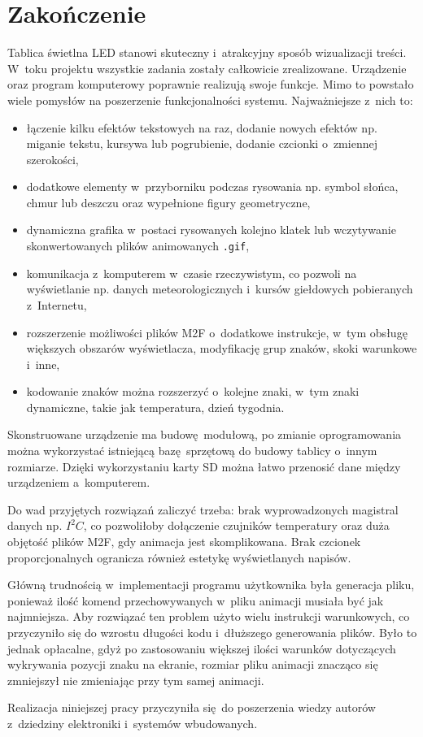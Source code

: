 \chapter{Zakończenie}

Tablica świetlna LED stanowi skuteczny i~atrakcyjny sposób wizualizacji treści. W~toku projektu wszystkie zadania zostały całkowicie zrealizowane. Urządzenie oraz program komputerowy poprawnie realizują swoje funkcje. Mimo to powstało wiele pomysłów na poszerzenie funkcjonalności systemu. Najważniejsze z~nich to:

\begin{itemize}
	\item łączenie kilku efektów tekstowych na raz, dodanie nowych efektów np. miganie tekstu, kursywa lub pogrubienie, dodanie czcionki o~zmiennej szerokości,
	\item dodatkowe elementy w~przyborniku podczas rysowania np. symbol słońca, chmur lub deszczu oraz wypełnione figury geometryczne,
	\item dynamiczna grafika w~postaci rysowanych kolejno klatek lub wczytywanie skonwertowanych plików animowanych \texttt{.gif},
	\item komunikacja z~komputerem w~czasie rzeczywistym, co pozwoli na wyświetlanie np. danych meteorologicznych i~kursów giełdowych pobieranych z~Internetu,
	\item rozszerzenie możliwości plików M2F o~dodatkowe instrukcje, w~tym obsługę większych obszarów wyświetlacza, modyfikację grup znaków, skoki warunkowe i~inne,
	\item kodowanie znaków można rozszerzyć o~kolejne znaki, w~tym znaki dynamiczne, takie jak temperatura, dzień tygodnia.
\end{itemize}

Skonstruowane urządzenie ma budowę modułową, po zmianie oprogramowania można wykorzystać istniejącą bazę sprzętową do budowy tablicy o~innym rozmiarze. Dzięki wykorzystaniu karty SD można łatwo przenosić dane między urządzeniem a~komputerem.

Do wad przyjętych rozwiązań zaliczyć trzeba: brak wyprowadzonych magistral danych np. $I^2C$, co pozwoliłoby dołączenie czujników temperatury oraz duża objętość plików M2F, gdy animacja jest skomplikowana. Brak czcionek proporcjonalnych ogranicza również estetykę wyświetlanych napisów.

Główną trudnością w~implementacji programu użytkownika była generacja pliku, ponieważ ilość komend przechowywanych w~pliku animacji musiała być jak najmniejsza. Aby rozwiązać ten problem użyto wielu instrukcji warunkowych, co przyczyniło się do wzrostu długości kodu i~dłuższego generowania plików. Było to jednak opłacalne, gdyż po zastosowaniu większej ilości warunków dotyczących wykrywania pozycji znaku na ekranie, rozmiar pliku animacji znacząco się zmniejszył nie zmieniając przy tym samej animacji.

Realizacja niniejszej pracy przyczyniła się do poszerzenia wiedzy autorów z~dziedziny elektroniki i~systemów wbudowanych.

